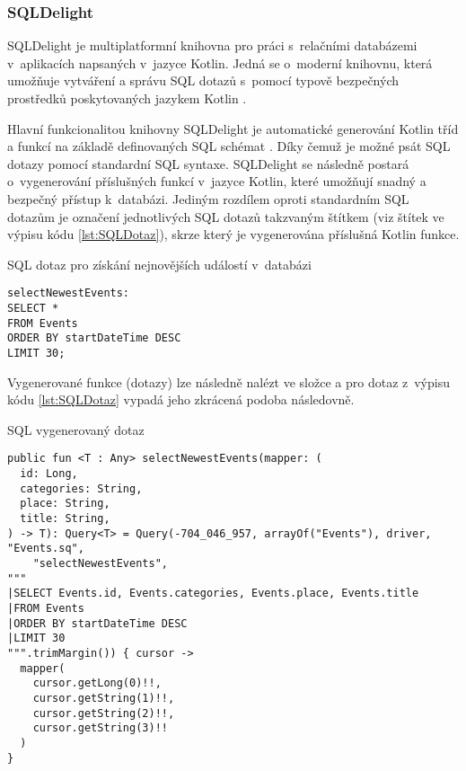 \subsubsection*{SQLDelight}
SQLDelight je multiplatformní knihovna pro práci s~relačními databázemi v~aplikacích napsaných v~jazyce Kotlin. Jedná se o~moderní knihovnu, 
která umožňuje vytváření a správu SQL dotazů s~pomocí typově bezpečných prostředků poskytovaných jazykem Kotlin \cite{sqldelight}.

\medskip

Hlavní funkcionalitou knihovny SQLDelight je automatické generování Kotlin tříd a funkcí na základě definovaných SQL schémat \cite{sqldelight}. Díky čemuž
je možné psát SQL dotazy pomocí standardní SQL syntaxe. SQLDelight se následně postará o~vygenerování příslušných funkcí v~jazyce Kotlin, které
umožňují  snadný a bezpečný přístup k~databázi. Jediným rozdílem oproti standardním SQL dotazům je označení jednotlivých SQL dotazů takzvaným 
štítkem (viz štítek  ve výpisu kódu \ref{lst:SQLDotaz}), skrze který je vygenerována příslušná Kotlin funkce. 

\begin{listing}[H]
\caption{SQL dotaz pro získání nejnovějších událostí v~databázi}\label{lst:SQLDotaz}
\begin{verbatim}
selectNewestEvents:
SELECT *
FROM Events
ORDER BY startDateTime DESC
LIMIT 30;
\end{verbatim}
\end{listing}

Vygenerované funkce (dotazy) lze následně nalézt ve složce  a pro dotaz z~výpisu kódu \ref{lst:SQLDotaz}
vypadá jeho zkrácená podoba následovně.

\begin{listing}[H]
\caption{SQL vygenerovaný dotaz}\label{lst:SQLGeneratedDotaz}
\begin{verbatim}
public fun <T : Any> selectNewestEvents(mapper: (
  id: Long,
  categories: String,
  place: String,
  title: String,
) -> T): Query<T> = Query(-704_046_957, arrayOf("Events"), driver, "Events.sq",
    "selectNewestEvents", 
"""
|SELECT Events.id, Events.categories, Events.place, Events.title
|FROM Events
|ORDER BY startDateTime DESC
|LIMIT 30
""".trimMargin()) { cursor ->
  mapper(
    cursor.getLong(0)!!,
    cursor.getString(1)!!,
    cursor.getString(2)!!,
    cursor.getString(3)!!
  )
}
\end{verbatim}
\end{listing}

